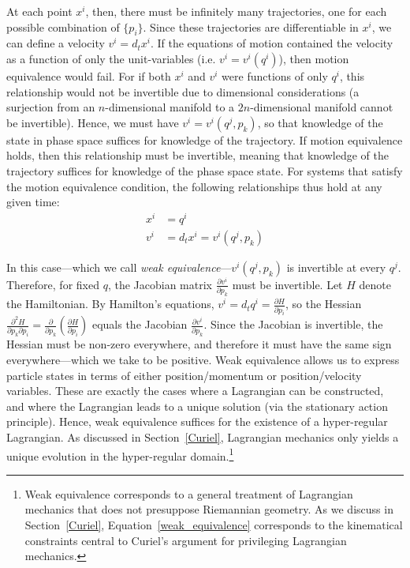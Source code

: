 \documentclass[12pt, twoside]{article}
\begin{document}
At each point $x^i$, then, there must be infinitely many trajectories, one for each possible combination of $\{p_i\}$. Since these trajectories are differentiable in $x^i$, we can define a velocity $v^i = d_t x^i$. If the equations of motion contained the velocity as a function of only the unit-variables (i.e. $v^i=v^i(q^i)$), then motion equivalence would fail. For if both $x^i$ and $v^i$ were functions of only $q^i$, this relationship would not be invertible due to dimensional considerations (a surjection from an $n$-dimensional manifold to a $2n$-dimensional manifold cannot be invertible). Hence, we must have $v^i=v^i(q^j, p_k)$, so that knowledge of the state in phase space suffices for knowledge of the trajectory. If motion equivalence holds, then this relationship must be invertible, meaning that knowledge of the trajectory suffices for knowledge of the phase space state. For systems that satisfy the motion equivalence condition, the following relationships thus hold at any given time:
\begin{equation}\label{weak_equivalence}
\begin{aligned}
x^i &= q^i \\
v^i &= d_t x^i = v^i(q^j, p_k)
\end{aligned}
\end{equation}

In this case---which we call \textit{weak equivalence}---$v^i(q^j, p_k)$ is invertible at every $q^j$. Therefore, for fixed $q$, the Jacobian matrix  $\frac{\partial v^i}{\partial p_k}$ must be invertible. Let $H$ denote the Hamiltonian. By Hamilton's equations, $v^i = d_t q^i = \frac{\partial H}{\partial p_i}$, so the Hessian $\frac{\partial^2 H}{\partial p_k \partial p_i} = \frac{\partial}{\partial p_k} (\frac{\partial H}{\partial p_i})$ equals the Jacobian $\frac{\partial v^i}{\partial p_k}$. Since the Jacobian is invertible, the Hessian must be non-zero everywhere, and therefore it must have the same sign everywhere---which we take to be positive. Weak equivalence allows us to express particle states in terms of either position/momentum or position/velocity variables. These are exactly the cases where a Lagrangian can be constructed, and where the Lagrangian leads to a unique solution (via the stationary action principle). Hence, weak equivalence suffices for the existence of a hyper-regular Lagrangian. As discussed in Section~\ref{Curiel}, Lagrangian mechanics only yields a unique evolution in the hyper-regular domain.\footnote{Weak equivalence corresponds to a general treatment of Lagrangian mechanics that does not presuppose Riemannian geometry. As we discuss in Section~\ref{Curiel}, Equation~\ref{weak_equivalence} corresponds to the kinematical constraints central to Curiel's \parencites*[]{Curiel} argument for privileging Lagrangian mechanics.}
\end{document}
